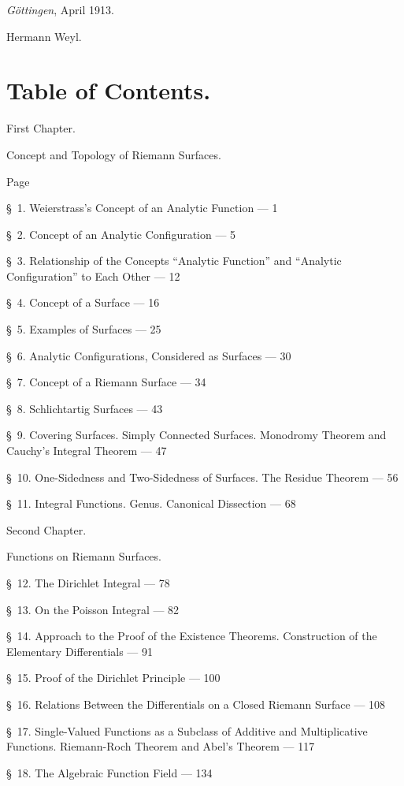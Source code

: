 \documentclass{article}
\begin{document}
\emph{Göttingen}, April 1913.

Hermann Weyl.


\section*{Table of Contents.}

First Chapter.

Concept and Topology of Riemann Surfaces.

Page

§~1. Weierstrass's Concept of an Analytic Function --- 1

§~2. Concept of an Analytic Configuration --- 5

§~3. Relationship of the Concepts ``Analytic Function'' and ``Analytic Configuration'' to Each Other --- 12

§~4. Concept of a Surface --- 16

§~5. Examples of Surfaces --- 25

§~6. Analytic Configurations, Considered as Surfaces --- 30

§~7. Concept of a Riemann Surface --- 34

§~8. Schlichtartig Surfaces --- 43

§~9. Covering Surfaces. Simply Connected Surfaces. Monodromy Theorem and Cauchy's Integral Theorem --- 47

§~10. One-Sidedness and Two-Sidedness of Surfaces. The Residue Theorem --- 56

§~11. Integral Functions. Genus. Canonical Dissection --- 68

Second Chapter.

Functions on Riemann Surfaces.

§~12. The Dirichlet Integral --- 78

§~13. On the Poisson Integral --- 82

§~14. Approach to the Proof of the Existence Theorems. Construction of the Elementary Differentials --- 91

§~15. Proof of the Dirichlet Principle --- 100

§~16. Relations Between the Differentials on a Closed Riemann Surface --- 108

§~17. Single-Valued Functions as a Subclass of Additive and Multiplicative Functions. Riemann-Roch Theorem and Abel's Theorem --- 117

§~18. The Algebraic Function Field --- 134
\end{document}
